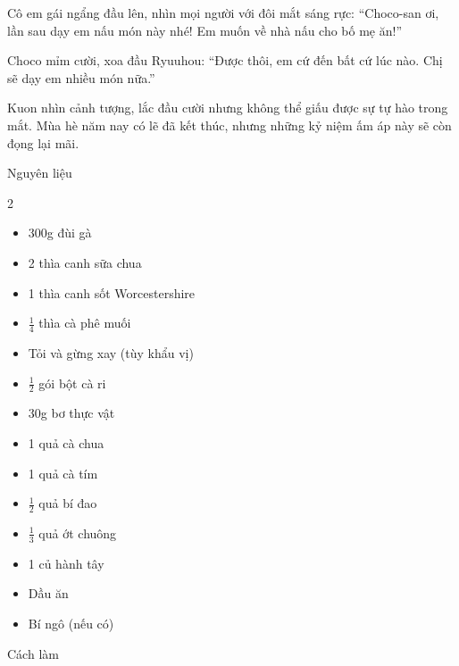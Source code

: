 \documentclass[../main.tex]{subfiles}
\begin{document}
Cô em gái ngẩng đầu lên, nhìn mọi người với đôi mắt sáng rực: ``Choco-san ơi, lần sau dạy em nấu món này nhé! Em muốn về nhà nấu cho bố mẹ ăn!''

Choco mỉm cười, xoa đầu Ryuuhou: ``Được thôi, em cứ đến bất cứ lúc nào. Chị sẽ dạy em nhiều món nữa.''

Kuon nhìn cảnh tượng, lắc đầu cười nhưng không thể giấu được sự tự hào trong mắt. Mùa hè năm nay có lẽ đã kết thúc, nhưng những kỷ niệm ấm áp này sẽ còn đọng lại mãi.

\newpage

\begin{center}{\abv\Large Nguyên liệu}\end{center}

\begin{multicols}{2}
  \begin{itemize}
    \item 300g đùi gà
    \item 2 thìa canh sữa chua
    \item 1 thìa canh sốt Worcestershire
    \item \(\frac{1}{4}\) thìa cà phê muối
    \item Tỏi và gừng xay (tùy khẩu vị)
    \item \(\frac{1}{2}\) gói bột cà ri
    \item 30g bơ thực vật
    \item 1 quả cà chua
    \item 1 quả cà tím
    \item \(\frac{1}{2}\) quả bí đao
    \item \(\frac{1}{3}\) quả ớt chuông
    \item 1 củ hành tây
    \item Dầu ăn
    \item Bí ngô (nếu có)
  \end{itemize}
\end{multicols}

\begin{center}{\abv\Large Cách làm}\end{center}
\end{document}
